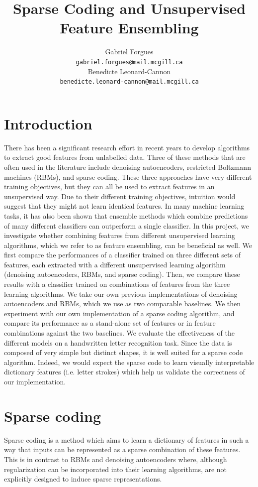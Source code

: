 \documentclass{article} %
\title{Sparse Coding and Unsupervised Feature Ensembling}
\author{
Gabriel Forgues \\
\texttt{gabriel.forgues@mail.mcgill.ca} \\
\And 
Benedicte Leonard-Cannon \\
\texttt{benedicte.leonard-cannon@mail.mcgill.ca} \\
}
\begin{document}
\maketitle

\section{Introduction}
There has been a significant research effort in recent years to develop algorithms to extract good features from unlabelled data. Three of these methods that are often used in the literature include denoising autoencoders, restricted Boltzmann machines (RBMs), and sparse coding. These three approaches have very different training objectives, but they can all be used to extract features in an unsupervised way. Due to their different training objectives, intuition would suggest that they might not learn identical features. In many machine learning tasks, it has also been shown that ensemble methods which combine predictions of many different classifiers can outperform a single classifier. In this project, we investigate whether combining features from different unsupervised learning algorithms, which we refer to as feature ensembling, can be beneficial as well. We first compare the performances of a classifier trained on three different sets of features, each extracted with a different unsupervised learning algorithm (denoising autoencoders, RBMs, and sparse coding). Then, we compare these results with a classifier trained on combinations of features from the three learning algorithms. We take our own previous implementations of denoising autoencoders and RBMs, which we use as two comparable baselines. We then experiment with our own implementation of a sparse coding algorithm, and compare its performance as a stand-alone set of features or in feature combinations against the two baselines. We evaluate the effectiveness of the different models on a handwritten letter recognition task. Since the data is composed of very simple but distinct shapes, it is well suited for a sparse code algorithm. Indeed, we would expect the sparse code to learn visually interpretable dictionary features (i.e. letter strokes) which help us validate the correctness of our implementation.

\section{Sparse coding}
Sparse coding is a method which aims to learn a dictionary of features in such a way that inputs can be represented as a sparse combination of these features. This is in contrast to RBMs and denoising autoencoders where, although regularization can be incorporated into their learning algorithms, are not explicitly designed to induce sparse representations.
\end{document}
